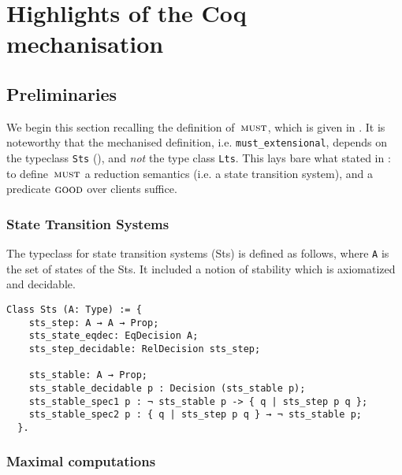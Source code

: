\section{Highlights of the Coq mechanisation}
\label{sec:coq}


\renewenvironment{mdframed}{}{}

\subsection{Preliminaries}
We begin this section recalling the definition of~$\operatorname{\textsc{must}}$, which is given in
. It is noteworthy that the mechanised definition, i.e.
\lstinline!must_extensional!, depends on the typeclass \lstinline!Sts!
(), and {\em not} the type class \lstinline!Lts!. This lays
bare what stated in : to define~$\operatorname{\textsc{must}}$  a reduction
semantics (i.e. a state transition system), and a predicate $\textsc{good}$ over
clients suffice.

\subsubsection{State Transition Systems}

The typeclass for state transition systems (Sts) is defined as follows, where
\texttt{A} is the set of states of the Sts. It included a notion of stability
which is axiomatized and decidable.

\begin{mdframed}
\begin{verbatim}
Class Sts (A: Type) := {
    sts_step: A → A → Prop;
    sts_state_eqdec: EqDecision A;
    sts_step_decidable: RelDecision sts_step;

    sts_stable: A → Prop;
    sts_stable_decidable p : Decision (sts_stable p);
    sts_stable_spec1 p : ¬ sts_stable p -> { q | sts_step p q };
    sts_stable_spec2 p : { q | sts_step p q } → ¬ sts_stable p;
  }.
\end{verbatim}
\label{fig:typeclass-sts}
\end{mdframed}

\subsubsection{Maximal computations}

